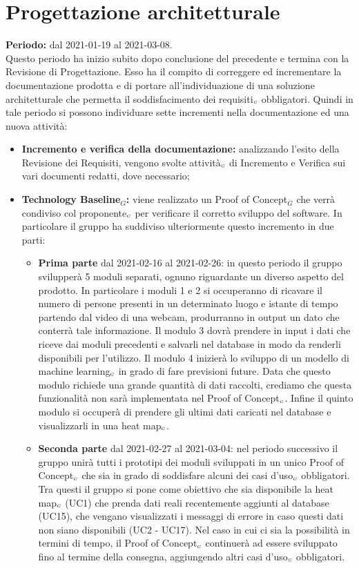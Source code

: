 \section{Progettazione architetturale}\label{PianificazioneProgettazioneArchitetturale}
\textbf{Periodo:} dal 2021-01-19 al 2021-03-08. \\
Questo periodo ha inizio subito dopo conclusione del precedente e termina con la Revisione di Progettazione.
Esso ha il compito di correggere ed incrementare la documentazione prodotta e di portare all'individuazione di una soluzione architetturale che permetta il soddisfacimento dei requisiti$_{\scaleto{G}{3pt}}$ obbligatori. Quindi in tale periodo si possono individuare sette incrementi nella documentazione ed una nuova attività:
\begin{itemize}
	\item \textbf{Incremento e verifica della documentazione:} analizzando l'esito della Revisione dei Requisiti, vengono svolte attività$_{\scaleto{G}{3pt}}$ di Incremento e Verifica sui vari documenti redatti, dove necessario;
	\item \textbf{Technology Baseline$_G$:}	viene realizzato un Proof of Concept$_G$ che verrà condiviso col proponente$_{\scaleto{G}{3pt}}$ per verificare il corretto sviluppo del software. In particolare il gruppo ha suddiviso ulteriormente questo incremento in due parti:
	\begin{itemize}
		\item \textbf{Prima parte} dal 2021-02-16 al 2021-02-26: in questo periodo il gruppo svilupperà 5 moduli separati, ognuno riguardante un diverso aspetto del prodotto. In particolare i moduli 1 e 2 si occuperanno di ricavare il numero di persone presenti in un determinato luogo e istante di tempo partendo dal video di una webcam, produrranno in output un dato che conterrà tale informazione. Il modulo 3 dovrà prendere in input i dati che riceve dai moduli precedenti e salvarli nel database in modo da renderli disponibili per l'utilizzo. Il modulo 4 inizierà lo sviluppo di un modello di machine learning$_{\scaleto{G}{3pt}}$ in grado di fare previsioni future. Data che questo modulo richiede una grande quantità di dati raccolti, crediamo che questa funzionalità non sarà implementata nel Proof of Concept$_{\scaleto{G}{3pt}}$. Infine il quinto modulo si occuperà di prendere gli ultimi dati caricati nel database e visualizzarli in una heat map$_{\scaleto{G}{3pt}}$.
		\item \textbf{Seconda parte} dal 2021-02-27 al 2021-03-04: nel periodo successivo il gruppo unirà tutti i prototipi dei moduli sviluppati in un unico Proof of Concept$_{\scaleto{G}{3pt}}$ che sia in grado di soddisfare alcuni dei casi d'uso$_{\scaleto{G}{3pt}}$ obbligatori. Tra questi il gruppo si pone come obiettivo che sia disponibile la heat map$_{\scaleto{G}{3pt}}$ (UC1) che prenda dati reali recentemente aggiunti al database (UC15), che vengano visualizzati i messaggi di errore in caso questi dati non siano disponibili (UC2 - UC17). Nel caso in cui ci sia la possibilità in termini di tempo, il Proof of Concept$_{\scaleto{G}{3pt}}$ continuerà ad essere sviluppato fino al termine della consegna, aggiungendo altri casi d'uso$_{\scaleto{G}{3pt}}$ obbligatori.

\end{itemize}
\end{itemize}
